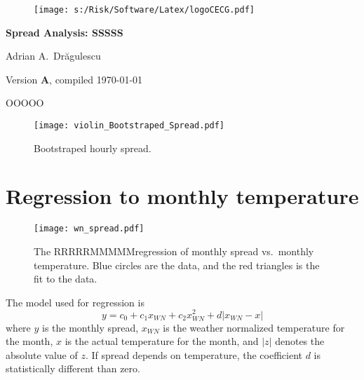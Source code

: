 \documentclass[letterpaper,10pt]{article}
\newcommand{\monthsOut}{OOOOO}
\newcommand{\model}{MMMMM}
\newcommand{\shortNames}{SSSSS}
\newcommand{\robust}{RRRRR}
\begin{document}
\begin{figure}
\texttt{[image: s:/Risk/Software/Latex/logoCECG.pdf]}
\hfill
{}
\end{figure}
 
\vspace*{0.5in}
\begin{center}
\LARGE\bf{Spread Analysis: \shortNames}
\end{center}
\begin{center}
   Adrian A.\ Dr\u{a}gulescu
\end{center}
\begin{center}
  \small{Version {\bf A}, compiled \today}
\end{center}
\vspace*{1in}

\monthsOut




\clearpage



\clearpage
\begin{figure}
\centerline{
 \texttt{[image: violin\_Bootstraped\_Spread.pdf]}} 
 \caption{Bootstraped hourly spread.}
\end{figure}


\clearpage
\section{Regression to monthly temperature}
\begin{figure}
\centerline{
 \texttt{[image: wn\_spread.pdf]}} 
 \caption{The \robust \model regression of monthly spread vs.\ monthly
   temperature.  Blue circles are the data, and the red triangles is the
   fit to the data.}
\end{figure}
%
The model used for regression is 
\begin{equation}
  y = c_0 + c_1 x_{WN} + c_2 x_{WN}^2 + d |x_{WN} - x|
\end{equation}
where $y$ is the monthly spread, $x_{WN}$ is the weather normalized
temperature for the month, $x$ is the actual temperature for the
month, and $|z|$ denotes the absolute value of $z$.  If spread depends
on temperature, the coefficient $d$ is statistically different than
zero.  
 
\end{document}
